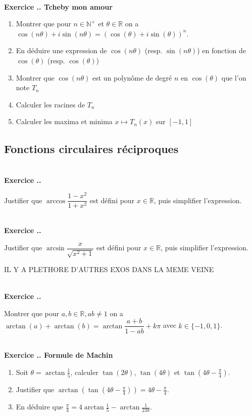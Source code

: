 \documentclass{article}
\newcommand{\mb}[1]{\mathbb{#1}}
\newcounter{exo}
\newcommand{\exercice}[1][\null]{\textbf{\\ \large Exercice \thesection.\theexo. \normalsize #1} \addtocounter{exo}{1}}
\begin{document}
\exercice[Tcheby mon amour]

\begin{enumerate}
    \item Montrer que pour $n \in \mb{N}^+$ 
        et $\theta \in \mb{R}$ on a $\cos (n\theta) + i \sin (n \theta) = (\cos
        (\theta) + i \sin (\theta))^n$.

    \item En déduire une expression de $\cos (n\theta)$ (resp. $\sin (n\theta)$)
        en fonction de $\cos (\theta)$ (resp. $\cos (\theta)$)

    \item Montrer que $\cos (n \theta)$ est un polynôme de degré $n$ en $\cos
        (\theta)$ que l'on note $T_n$

    \item Calculer les racines de $T_n$
    \item Calculer les maxima et minima $x \mapsto T_n(x)$ sur $[-1,1]$

\end{enumerate}
        
\subsection{Fonctions circulaires réciproques}

\exercice

Justifier que $\arccos \dfrac{1-x^2}{1+x^2}$ est défini pour $x \in \mb{R}$, puis simplifier l'expression.

\exercice

Justifier que $\arcsin \dfrac{x}{\sqrt{x^2 +1}}$ est défini pour $x \in \mb{R}$, puis simplifier l'expression.

IL Y A PLETHORE D'AUTRES EXOS DANS LA MEME VEINE


\exercice

Montrer que pour $a,b \in \mb{R}, ab \neq 1$ on a $\arctan(a) + \arctan(b) = \arctan \dfrac{a+b}{1-ab} + k \pi$ avec $k \in \{ -1, 0, 1 \}$.


\exercice[Formule de Machin]

\begin{enumerate} 

\item Soit $\theta = \arctan \frac{1}{5}$, calculer $\tan(2\theta)$, $\tan(4 \theta)$ et $\tan(4 \theta - \frac{\pi}{4})$.

\item Justifier que $\arctan(\tan(4 \theta-\frac{\pi}{4})) = 4 \theta-\frac{\pi}{4}$.

\item En déduire que $\displaystyle \frac{\pi}{4} = 4 \arctan\frac{1}{5} -  \arctan\frac{1}{239}$.

\end{enumerate}
\end{document}
